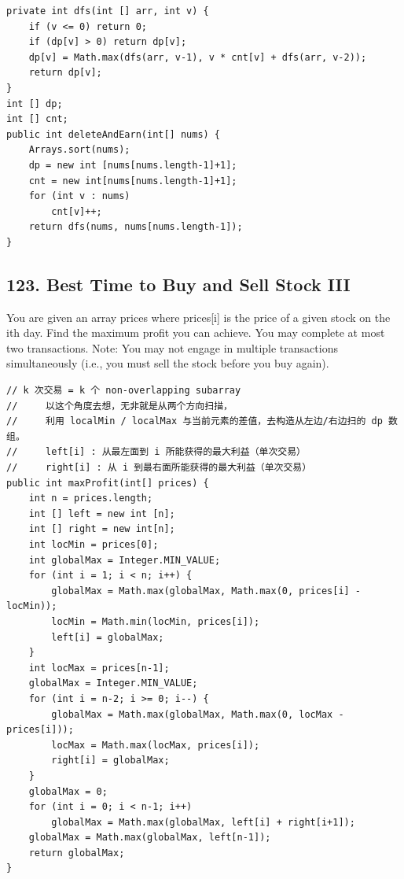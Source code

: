 \documentclass[9pt, b5paper]{article}
\begin{document}
\begin{verbatim}
private int dfs(int [] arr, int v) {
    if (v <= 0) return 0;
    if (dp[v] > 0) return dp[v];
    dp[v] = Math.max(dfs(arr, v-1), v * cnt[v] + dfs(arr, v-2));
    return dp[v];
}
int [] dp;
int [] cnt;
public int deleteAndEarn(int[] nums) {
    Arrays.sort(nums);
    dp = new int [nums[nums.length-1]+1];
    cnt = new int[nums[nums.length-1]+1];
    for (int v : nums)
        cnt[v]++;
    return dfs(nums, nums[nums.length-1]);
}
\end{verbatim}

\subsection{123. Best Time to Buy and Sell Stock III}
\label{sec-4-27}
You are given an array prices where prices[i] is the price of a given stock on the ith day.
Find the maximum profit you can achieve. You may complete at most two transactions.
Note: You may not engage in multiple transactions simultaneously (i.e., you must sell the stock before you buy again).
\begin{verbatim}
// k 次交易 = k 个 non-overlapping subarray
//     以这个角度去想，无非就是从两个方向扫描，
//     利用 localMin / localMax 与当前元素的差值，去构造从左边/右边扫的 dp 数组。
//     left[i] : 从最左面到 i 所能获得的最大利益（单次交易）
//     right[i] : 从 i 到最右面所能获得的最大利益（单次交易）
public int maxProfit(int[] prices) {
    int n = prices.length;
    int [] left = new int [n];
    int [] right = new int[n];
    int locMin = prices[0];
    int globalMax = Integer.MIN_VALUE;
    for (int i = 1; i < n; i++) {
        globalMax = Math.max(globalMax, Math.max(0, prices[i] - locMin));
        locMin = Math.min(locMin, prices[i]);
        left[i] = globalMax;
    }
    int locMax = prices[n-1];
    globalMax = Integer.MIN_VALUE;
    for (int i = n-2; i >= 0; i--) {
        globalMax = Math.max(globalMax, Math.max(0, locMax - prices[i]));
        locMax = Math.max(locMax, prices[i]);
        right[i] = globalMax;
    }
    globalMax = 0;
    for (int i = 0; i < n-1; i++) 
        globalMax = Math.max(globalMax, left[i] + right[i+1]);
    globalMax = Math.max(globalMax, left[n-1]);
    return globalMax;
}
\end{verbatim}
\end{document}
